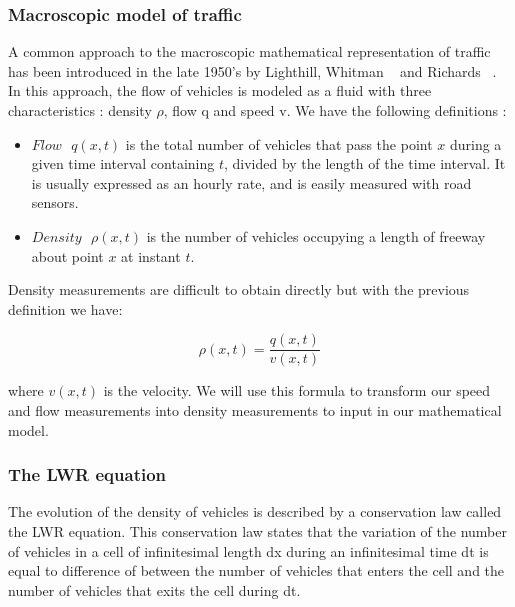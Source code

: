 \documentclass[letterpaper,10pt]{article}
\begin{document}
\subsubsection{Macroscopic model of traffic}

A common approach to the macroscopic mathematical representation of traffic has been introduced in the late 1950's by Lighthill, Whitman ~\cite{Lighthill1955} and Richards ~\cite{Richards1956}. In this approach, the flow of vehicles is modeled as a fluid with three characteristics : density $\rho$, flow q and speed v.  We have the following definitions :

\begin{itemize}
\item $Flow\text{ }q(x,t)$ is the total number of vehicles that pass the point $x$ during a given time interval containing $t$, divided by the length of the time interval. It is usually expressed as an hourly rate, and is easily measured with road sensors.
\item $Density\text{ }\rho(x,t)$ is the number of vehicles occupying a length of freeway about point $x$ at instant $t$. 
\end{itemize}

Density measurements are difficult to obtain directly but with the previous definition we have:

\begin{equation}\label{eq:density}
\rho(x,t)=\frac{q(x,t)}{v(x,t)}
\end{equation}

where $v(x,t)$ is the velocity. We will use this formula to transform our speed and flow measurements into density measurements to input in our mathematical model.

\subsubsection{The LWR equation}
The evolution of the density of vehicles is described by a conservation law called the LWR equation. This conservation law states that the variation of the number of vehicles in a cell of infinitesimal length dx during an infinitesimal time dt is equal to difference of between the number of vehicles that enters the cell and the number of vehicles that exits the cell during dt.
\end{document}
